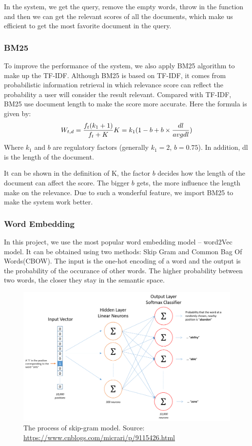 \documentclass[UTF8]{article}
\begin{document}
	In the system, we get the query, remove the empty words, throw in the function and then we can get the relevant scores of all the documents, which make us efficient to get the most favorite document in the query.
	
	\subsubsection{BM25}
	To improve the performance of the system, we also apply BM25 algorithm to make up the TF-IDF. Although BM25 is based on TF-IDF, it comes from probabilistic information retrieval in which relevance score can reflect the probability a user will consider the result relevant. Compared with TF-IDF, BM25 use document length to make the score more accurate. Here the formula is given by:
	\[ W_{t,d} = \frac{f_t (k_1+1)}{f_t+K}
	\\ K = k_1(1 - b + b \times \frac{dl}{avgdl}) \]
	Where $k_1$ and $b$ are regulatory factors (generally $k_1 = 2$, $b=0.75$). In addition, dl is the length of the document.
	
	It can be shown in the definition of K, the factor $b$ decides how the length of the document can affect the score. The bigger $b$ gets, the more influence the length make on the relevance. Due to such a wonderful feature, we import BM25 to make the system work better.
	
	\subsubsection{Word Embedding}
	In this project, we use the most popular word embedding model -- word2Vec model. It can be obtained using two methods: Skip Gram and Common Bag Of Words(CBOW). The input is the one-hot encoding of a word and the output is the probability of the occurance of other words. The higher probability between two words, the closer they stay in the semantic space.
	
	\begin{figure}[H]
		\centering
		\includegraphics[width=0.7\linewidth]{./image/img16}
		\caption{The process of skip-gram model. Source: \url{https://www.cnblogs.com/micrari/p/9115426.html}}
		\label{fig:img1}
	\end{figure}
	
\end{document}
